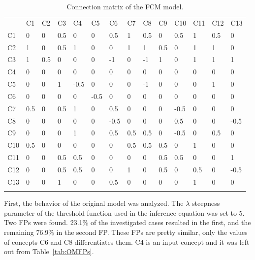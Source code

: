 \documentclass[graybox]{svmult}
\begin{document}
\begin{table}
\caption{Connection matrix of the FCM model.}
\label{tab:OMconnectionMtx}
\begin{center}
\begin{tabular}{l|lllllllllllll}
\hline\noalign{\smallskip}
 & C1 & C2 & C3 & C4 & C5 & C6 & C7 & C8 & C9 & C10 & C11 & C12 & C13\\
\noalign{\smallskip}\hline\noalign{\smallskip}
C1 &    0 &     0 &     0.5 &   0 &     0 &     0.5 &   1 &     0.5 &   0 &     0.5 &   1 &     0.5 &   0\\
C2 &    1 &     0 &     0.5 &   1 &     0 &     0 &     1 &     1 &     0.5 &   0 &     1 &     1 &     0\\
C3 &    1 &     0.5 &   0 &     0 &     0 &     -1 &    0 &     -1 &    1 &     0 &     1 &     1 &     1\\
C4 &    0 &     0 &     0 &     0 &     0 &     0 &     0 &     0 &     0 &     0 &     0 &     0 &     0\\
C5 &    0 &     0 &     1 &     -0.5 &  0 &     0 &     0 &     -1 &    0 &     0 &     0 &     1 &     0\\
C6 &    0 &     0 &     0 &     0 &     -0.5 &  0 &     0 &     0 &     0 &     0 &     0 &     0 &     0\\
C7 &    0.5 &   0 &     0.5 &   1 &     0 &     0.5 &   0 &     0 &     0 &     -0.5 &  0 &     0 &     0\\
C8 &    0 &     0 &     0 &     0 &     0 &     -0.5 &  0 &     0 &     0 &     0.5 &   0 &     0 &     -0.5\\
C9 &    0 &     0 &     0 &     1 &     0 &     0.5 &   0.5 &   0.5 &   0 &     -0.5 &  0 &     0.5 &   0\\
C10 &   0.5 &   0 &     0 &     0 &     0 &     0 &     0.5 &   0.5 &   0.5 &   0 &     1 &     0 &     0\\
C11 &   0 &     0 &     0.5 &   0.5 &   0 &     0 &     0 &     0 &     0.5 &   0.5 &   0 &     0 &     1\\
C12 &   0 &     0 &     0.5 &   0.5 &   0 &     0 &     1 &     0 &     0.5 &   0 &     0.5 &   0 &     -0.5\\
C13 &   0 &     0 &     1 &     0 &     0 &     0.5 &   0 &     0 &     0 &     0 &     1 &     0 &     0\\
\noalign{\smallskip}\hline
\end{tabular}
\end{center}
\end{table}

First, the behavior of the original model was analyzed. The $\lambda$ 
steepness parameter of the threshold function used in the inference 
equation was set to 5. Two FPs were found. 23.1\% of the investigated 
cases resulted in the first, and the remaining 76.9\% in the second 
FP. These FPs are pretty similar, only the values of concepts C6 and 
C8 differentiates them. C4 is an input concept and it was left out 
from Table~\ref{tab:OMFPs}.
\end{document}
